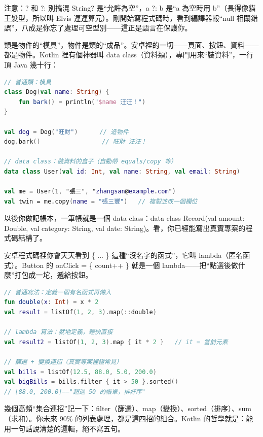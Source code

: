 \begin{tcbwarn}{注意：? 和 ?: 別搞混}
String? 是“允許為空”，a ?: b 是“a 為空時用 b”（長得像貓王髮型，所以叫 Elvis 運運算元）。剛開始寫程式碼時，看到編譯器報“null 相關錯誤”，八成是你忘了處理可空型別——這正是語言在保護你。

\end{tcbwarn}


類是物件的“模具”，物件是類的“成品”。安卓裡的一切——頁面、按鈕、資料——都是物件。Kotlin 裡有個神器叫 data class（資料類），專門用來“裝資料”，一行頂 Java 幾十行：

\begin{lstlisting}[language=Kotlin]
// 普通類：模具
class Dog(val name: String) {
    fun bark() = println("$name 汪汪！")
}

val dog = Dog("旺財")      // 造物件
dog.bark()                 // 旺財 汪汪！

// data class：裝資料的盒子（自動帶 equals/copy 等）
data class User(val id: Int, val name: String, val email: String)

val me = User(1, "張三", "zhangsan@example.com")
val twin = me.copy(name = "張三豐")   // 複製並改一個欄位
\end{lstlisting}

以後你做記帳本，一筆帳就是一個 data class：data class Record(val amount: Double, val category: String, val date: String)。看，你已經能寫出真實專案的程式碼結構了。


安卓程式碼裡你會天天看到 \{ ... \} 這種“沒名字的函式”，它叫 lambda（匿名函式）。Button 的 onClick = \{ count++ \} 就是一個 lambda——把“點選後做什麼”打包成一坨，遞給按鈕。

\begin{lstlisting}[language=Kotlin]
// 普通寫法：定義一個有名函式再傳入
fun double(x: Int) = x * 2
val result = listOf(1, 2, 3).map(::double)

// lambda 寫法：就地定義，輕快直接
val result2 = listOf(1, 2, 3).map { it * 2 }   // it = 當前元素

// 篩選 + 變換連招（真實專案裡極常見）
val bills = listOf(12.5, 88.0, 5.0, 200.0)
val bigBills = bills.filter { it > 50 }.sorted()
// [88.0, 200.0]——"超過 50 的帳單，排好序"
\end{lstlisting}

幾個高頻“集合連招”記一下：filter（篩選）、map（變換）、sorted（排序）、sum（求和）。你未來 90\% 的列表處理，都是這四招的組合。Kotlin 的哲學就是：能用一句話說清楚的邏輯，絕不寫五句。

